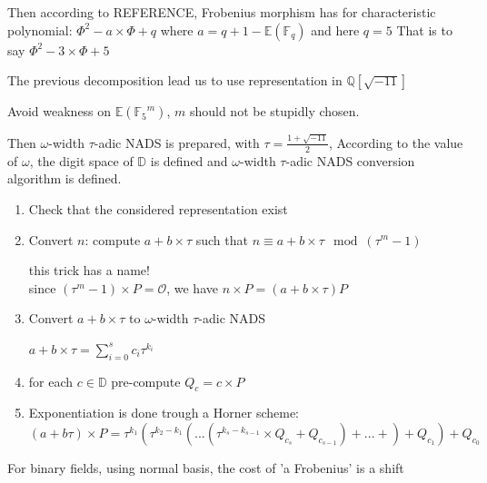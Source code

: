 Then according to REFERENCE, Frobenius morphism has for characteristic polynomial:
$\Phi^2 -a \times \Phi +q$ where $a = q+1 - \mathbb{E}({\mathbb{F}_q}) $ and here $q=5$
That is to say $\Phi^2 -3 \times \Phi + 5$

The previous decomposition lead us to use representation in $\mathbb{Q}[\sqrt{-11}]$

Avoid weakness on $\mathbb{E}({\mathbb{F}_5}^m)$, $m$ should not be stupidly chosen.

Then $\omega$-width $\tau$-adic NADS is prepared, with $\tau = \frac{1+\sqrt{-11}}{2}$,
According to the value of $\omega$, the digit space of $ \mathbb{D} $ is defined 
and $\omega$-width $\tau$-adic NADS conversion algorithm is defined.

\begin{enumerate}
\item Check that the considered representation exist
\item Convert $n$: compute $a+b \times \tau$ such that 
	$n \equiv a+b \times \tau \mod (\tau^m -1)$ 

	this trick has a name!\\
	since $(\tau^m -1) \times P =\mathcal{O}$, we have $n \times P = ( a+b \times \tau) P$

\item Convert $ a+b \times \tau$ to $\omega$-width $\tau$-adic NADS
\begin{center}
	$  a+b \times \tau  = \sum \limits_{i=0}^s c_i \tau^{k_i}$
\end{center}
\item for each $c \in \mathbb{D}$ pre-compute $Q_c = c \times  P$

\item Exponentiation is done trough a Horner scheme:\\
$(a+b  \tau) \times P  = 
\tau^{k_1}(\tau^{k_2-k_1} (... (\tau^{k_s-k_{s-1}}\times Q_{c_s} + Q_{c_{s-1}} )+ ... +)
+Q_{c_1})+Q_{c_0} $

\end{enumerate}
For binary fields, using normal basis, the cost of 'a Frobenius' is a shift
